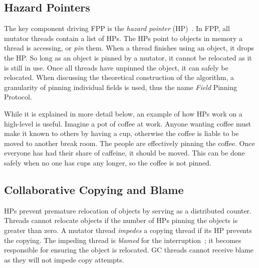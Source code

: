 \documentclass{sig-alternate}
\begin{document}
\subsection{Hazard Pointers}
\label{sec:fppHazard}

The key component driving FPP is the \emph{hazard pointer} (HP)~\cite{Osterlund:FPP}. 
In FPP, all mutator threads contain a list of HPs.
The HPs point to objects in memory a thread is accessing, or \emph{pin} them.
When a thread finishes using an object, it drops the HP.
So long as an object
is pinned by a mutator, it cannot be relocated as it is still in use. Once all threads have
unpinned the object, it can safely be relocated.
When discussing the theoretical construction of the algorithm, a granularity of pinning 
individual fields is used, thus the name \emph{Field} Pinning Protocol. 

While it is explained in more detail below, an example of how HPs 
work on a high-level is useful. Imagine a pot of coffee at work. Anyone 
wanting coffee must make it known to others by having a cup, otherwise the 
coffee is liable to be moved to another break room. The people are effectively pinning the coffee.
Once everyone has had their share of caffeine, it should be moved. This can
be done safely when no one has cups any longer, so the coffee is not pinned.



\subsection{Collaborative Copying and Blame}
\label{sec:fppCopy}

HPs prevent premature relocation of objects by serving as a distributed
counter. Threads cannot relocate objects if the number of
HPs pinning the objects is greater than zero.
A mutator thread \emph{impedes} a copying thread if
its HP prevents the copying.
The impeding thread is \emph{blamed} for the 
interruption~\cite{Osterlund:FPP}; it becomes responsible for ensuring 
the object is relocated. GC threads cannot receive blame as they will not impede
copy attempts.
\end{document}
